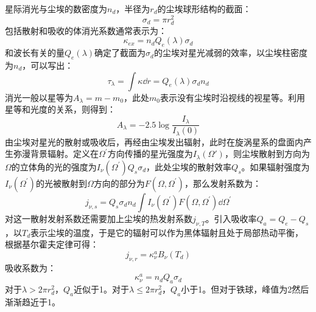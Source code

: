 星际消光与尘埃的数密度为$n_{d}$，半径为$r_{d}$的尘埃球形结构的截面：
\begin{equation}
	\sigma_{d}=\pi r_{d}^2
\end{equation}
包括散射和吸收的体消光系数通常表示为：
\begin{equation}
	\kappa_{ex}=n_{d}Q_{e}(\lambda)\sigma_{d}
\end{equation}
和波长有关的量$Q_{e}(\lambda)$确定了截面为$\sigma_{d}$的尘埃对星光减弱的效率，以尘埃柱密度为$n_{d}$，可以写出：
\begin{equation}
	\tau_{\lambda}=\int \kappa \dd r=Q_{e}(\lambda)\sigma_{d}n_{d}
\end{equation}
消光一般以星等为$A_{\lambda}=m-m_{0}$，此处$m_{0}$表示没有尘埃时沿视线的视星等。利用星等和光度的关系，则得到：
\begin{equation}
	A_{\lambda}=-2.5\log\frac{I_{\lambda}}{I_{\lambda}(0)}
\end{equation}
由尘埃对星光的散射或吸收后，再经由尘埃发出辐射，此时在旋涡星系的盘面内产生弥漫背景辐射。定义在$\Omega^\prime$方向传播的星光强度为$I_{\lambda}(\Omega\prime)$，则尘埃散射到方向为$\Omega$的立体角的光的强度为$I_{\nu}(\Omega^\prime)Q_{s}\sigma_{d}$，此处尘埃的散射效率$Q_{s}$。如果辐射强度为$I_{\nu}(\Omega^\prime)$的光被散射到$\Omega$方向的部分为$F(\Omega,\Omega^\prime)$，那么发射系数为：
\begin{equation}
	j_{\nu,s}=Q_{s}\sigma_{d}n_{d}\int I_{\nu}(\Omega^\prime)F(\Omega,\Omega^\prime)\dd \Omega^\prime
\end{equation}
对这一散射发射系数还需要加上尘埃的热发射系数$j_{\nu,T}$。引入吸收率$Q_{a}=Q_{e}-Q_{s}$，以$T_{d}$表示尘埃的温度，于是它的辐射可以作为黑体辐射且处于局部热动平衡，根据基尔霍夫定律可得：
\begin{equation}
	j_{\nu,r}=\kappa_{\nu}^{a}B_{\nu}(T_{d})
\end{equation}
吸收系数为：
\begin{equation}
	\kappa_{\nu}^{a}=n_{d}Q_{a}\sigma_{d}
\end{equation}
对于$\lambda>2\pi r_{d}^2$，$Q_{a}$近似于1。对于$\lambda\leq 2\pi r_{d}^2$，$Q_{a}$小于1。但对于铁球，峰值为2然后渐渐趋近于1。
